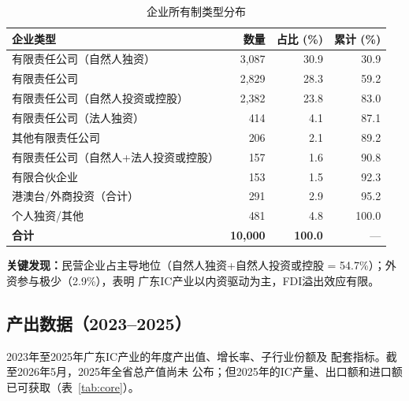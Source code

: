 \documentclass[12pt,a4paper]{article}
\newcommand{\tableHeaderRow}{\rowcolor{tealPrimary}\color{white}}
\newcommand{\tableOddRow}{\rowcolor{mintBG}}
\newcommand{\tableEvenRow}{\rowcolor{white}}
\begin{document}
\begin{table}[H]
\centering
\caption{企业所有制类型分布}
\label{tab:enterprise_type}
\begin{tabular}{lrrr}
\toprule
\tableHeaderRow
\textbf{企业类型} & \textbf{数量} & \textbf{占比 (\%)} & \textbf{累计 (\%)} \\
\midrule
\tableOddRow  有限责任公司（自然人独资）            & 3,087 & 30.9 & 30.9 \\
\tableEvenRow 有限责任公司                           & 2,829 & 28.3 & 59.2 \\
\tableOddRow  有限责任公司（自然人投资或控股）       & 2,382 & 23.8 & 83.0 \\
\tableEvenRow 有限责任公司（法人独资）               & 414   & 4.1  & 87.1 \\
\tableOddRow  其他有限责任公司                       & 206   & 2.1  & 89.2 \\
\tableEvenRow 有限责任公司（自然人+法人投资或控股）  & 157  & 1.6  & 90.8 \\
\tableOddRow  有限合伙企业                           & 153   & 1.5  & 92.3 \\
\tableEvenRow 港澳台/外商投资（合计）                & 291   & 2.9  & 95.2 \\
\tableOddRow  个人独资/其他                          & 481   & 4.8  & 100.0 \\
\midrule
\tableEvenRow \textbf{合计} & \textbf{10,000} & \textbf{100.0} & --- \\
\bottomrule
\end{tabular}
\end{table}


\textbf{关键发现：}民营企业占主导地位（自然人独资+自然人投资或控股
= 54.7\%）；外资参与极少（2.9\%），表明
广东IC产业以内资驱动为主，FDI溢出效应有限。


\subsection{产出数据（2023--2025）}
\label{sec:output}

2023年至2025年广东IC产业的年度产出值、增长率、子行业份额及
配套指标。截至2026年5月，2025年全省总产值尚未
公布；但2025年的IC产量、出口额和进口额
已可获取（表~\ref{tab:core}）。
\end{document}
